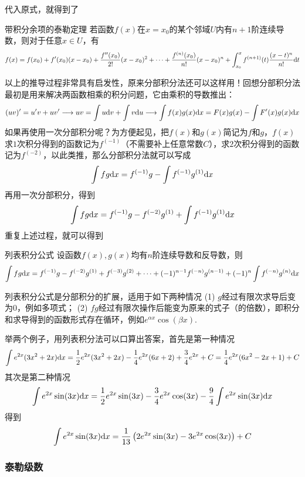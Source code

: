 代入原式，就得到了
\begin{theorem}{带积分余项的泰勒定理}
    若函数\(f(x)\)在\(x=x_0\)的某个邻域\(U\)内有\(n+1\)阶连续导数，则对于任意\(x\in U\)，有
    \[f(x)=f(x_0)+f'(x_0)(x-x_0)+\frac{f''(x_0)}{2!}(x-x_0)^2+\cdots+\frac{f^{(n)}(x_0)}{n!}(x-x_0)^n+\int_{x_0}^{x}f^{(n+1)}(t)\frac{(x-t)^{n}}{n!}{\rm d}t\]
\end{theorem}

以上的推导过程非常具有启发性，原来分部积分法还可以这样用！回想分部积分法最初是用来解决两函数相乘的积分问题，它由乘积的导数推出：
\[(uv)'=u'v+uv' \longrightarrow uv = \int u{\rm d}v+\int v{\rm d}u  \longrightarrow \int f(x)g(x){\rm d}x = F(x)g(x)-\int F'(x)g(x){\rm d}x\]
如果再使用一次分部积分呢？为方便起见，把\(f(x)\)和\(g(x)\)简记为\(f\)和\(g\)，\(f(x)\)求\(1\)次积分得到的函数记为\(f^{(-1)}\)（不需要补上任意常数\(C\)），求\(2\)次积分得到的函数记为\(f^{(-2)}\)，以此类推，那么分部积分法就可以写成
\[\int fg{\rm d}x=f^{(-1)}g-\int f^{(-1)}g^{(1)} {\rm d}x\]
再用一次分部积分，得到
\[\int fg{\rm d}x=f^{(-1)}g-f^{(-2)}g^{(1)}+\int f^{(-1)}g^{(1)} {\rm d}x\]
重复上述过程，就可以得到
\begin{theorem}{列表积分公式}
    设函数\(f(x),g(x)\)均有\(n\)阶连续导数和反导数，则
    \[\int fg{\rm d}x=f^{(-1)}g-f^{(-2)}g^{(1)}+f^{(-3)}g^{(2)}+\cdots+(-1)^{n-1}f^{(-n)}g^{(n-1)}+(-1)^n\int f^{(-n)}g^{(n)} {\rm d}x\]
\end{theorem}

列表积分公式是分部积分的扩展，适用于如下两种情况
\newline
(1) \(g\)经过有限次求导后变为\(0\)，例如多项式；\newline
(2) \(fg\)经过有限次操作后能变为原来的式子（的倍数），即积分和求导得到的函数形式存在循环，例如\(e^{\alpha x}\cos(\beta x)\).

举两个例子，用列表积分法可以口算出答案，首先是第一种情况
\[\int e^{2x}(3x^2+2x){\rm d}x = \frac{1}{2}e^{2x}(3x^2+2x)-\frac{1}{4}e^{2x}(6x+2)+\frac{3}{4}e^{2x}+C=\frac{1}{4}e^{2x}(6x^2-2x+1)+C\]
其次是第二种情况
\[\int e^{2x}\sin(3x){\rm d}x = \frac{1}{2}e^{2x}\sin(3x)-\frac{3}{4}e^{2x}\cos(3x)-\frac{9}{4}\int e^{2x}\sin(3x){\rm d}x\]
得到
\[\int e^{2x}\sin(3x){\rm d}x = \frac{1}{13}\left(2e^{2x}\sin(3x)-3e^{2x}\cos(3x)\right)+C\]

\subsubsection{泰勒级数}

